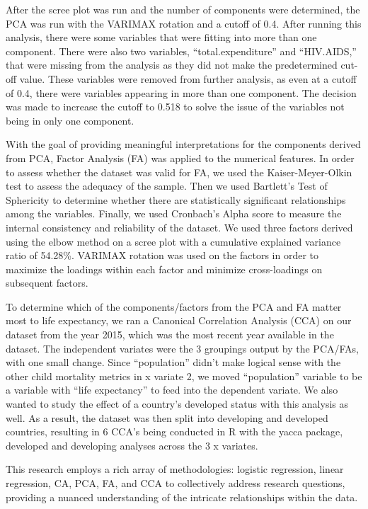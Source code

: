 \documentclass[12pt]{article}
\begin{document}
\begin{multicols}{2}
After the scree plot was run and the number of components were determined, the PCA was run with the VARIMAX rotation and a cutoff of 0.4. After running this analysis, there were some variables that were fitting into more than one component. There were also two variables, “total.expenditure” and “HIV.AIDS,” that were missing from the analysis as they did not make the predetermined cut-off value. These variables were removed from further analysis, as even at a cutoff of 0.4, there were variables appearing in more than one component. The decision was made to increase the cutoff to 0.518 to solve the issue of the variables not being in only one component.

With the goal of providing meaningful interpretations for the components derived from PCA, Factor Analysis (FA) was applied to the numerical features. In order to assess whether the dataset was valid for FA, we used the Kaiser-Meyer-Olkin test to assess the adequacy of the sample. Then we used Bartlett’s Test of Sphericity to determine whether there are statistically significant relationships among the variables. Finally, we used Cronbach’s Alpha score to measure the internal consistency and reliability of the dataset. We used three factors derived using the elbow method on a scree plot with a cumulative explained variance ratio of 54.28\%. VARIMAX rotation was used on the factors in order to maximize the loadings within each factor and minimize cross-loadings on subsequent factors.

To determine which of the components/factors from the PCA and FA matter most to life expectancy, we ran a Canonical Correlation Analysis (CCA) on our dataset from the year 2015, which was the most recent year available in the dataset. The independent variates were the 3 groupings output by the PCA/FAs, with one small change. Since “population” didn’t make logical sense with the other child mortality metrics in x variate 2, we moved “population” variable to be a variable with “life expectancy” to feed into the dependent variate.  We also wanted to study the effect of a country’s developed status with this analysis as well. As a result, the dataset was then split into developing and developed countries, resulting in 6 CCA’s being conducted in R with the yacca package, developed and developing analyses across the 3 x variates.

This research employs a rich array of methodologies: logistic regression, linear regression, CA, PCA, FA, and CCA to collectively address research questions, providing a nuanced understanding of the intricate relationships within the data.



\end{multicols}
\end{document}
